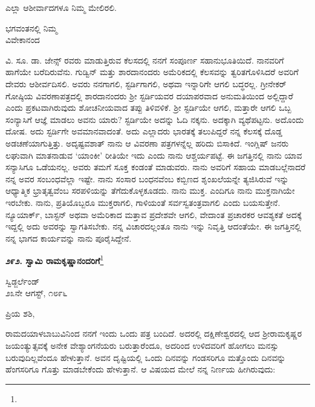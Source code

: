ಎಲ್ಲಾ ಆಶೀರ್ವಾದಗಳೂ ನಿಮ್ಮ ಮೇಲಿರಲಿ.
\vspace{-0.4cm}

\begin{flushright}
ಭಗವಂತನಲ್ಲಿ ನಿಮ್ಮ\\ವಿವೇಕಾನಂದ
\end{flushright}
\vspace{-0.2cm}

ವಿ. ಸೂ.\enginline{-} ಡಾ. ಜೇನ್ಸ್ ರವರು ಮಾಡುತ್ತಿರುವ ಕೆಲಸದಲ್ಲಿ ನನಗೆ ಸಂಪೂರ್ಣ ಸಹಾನುಭೂತಿಯಿದೆ. ನಾನವರಿಗೆ ಹಾಗೆಯೇ ಬರೆದಿರುವೆನು. ಗುಡ್ವಿನ್ ಮತ್ತು ಶಾರದಾನಂದರು ಅಮೆರಿಕದಲ್ಲಿ ಕೆಲಸವನ್ನು ತ್ವರಿತಗೊಳಿಸಿದರೆ ಅವರಿಗೆ ದೇವರು ಆಶೀರ್ವದಿಸಲಿ. ಅವರು ನನಗಾಗಲಿ, ಸ್ಟರ್ಡಿಗಾಗಲಿ, ಅಥವಾ ಇನ್ನಾರಿಗೇ ಆಗಲಿ ಬದ್ಧರಲ್ಲ. ಗ್ರೀನೇಕರ್‌ ಗೋಷ್ಠಿಯ ವಿವರಣಾಪತ್ರದಲ್ಲಿ ಶಾರದಾನಂದರು ಶ‍್ರೀ ಸ್ಟರ್ಡಿಯವರ ದಯಾಪರವಾದ ಅನುಮತಿಯಿಂದ ಅಲ್ಲಿದ್ದಾರೆ ಎಂದು ಪ್ರಕಟವಾಗಿರುವುದು ಶೋಚನೀಯವಾದ ತಪ್ಪು ತಿಳಿವಳಿಕೆ. ಶ‍್ರೀ ಸ್ಟರ್ಡಿಯೇ ಆಗಲಿ, ಮತ್ತಾರೇ ಆಗಲಿ ಒಬ್ಬ ಸಂನ್ಯಾಸಿಗೆ ಆಜ್ಞೆ ಮಾಡಲು ಅವನು ಯಾರು? ಸ್ಟರ್ಡಿಯೇ ಅದನ್ನು ಓದಿ ನಕ್ಕನು. ಅದಕ್ಕಾಗಿ ವ್ಯಥೆಪಟ್ಟನು. ಅದೊಂದು ದೋಷ. ಅದು ಸ್ಟರ್ಡಿಗೇ ಅವಮಾನವಾದಂತೆ. ಅದು ಎಲ್ಲಾದರು ಭಾರತಕ್ಕೆ ತಲುಪಿದ್ದರೆ ನನ್ನ ಕೆಲಸಕ್ಕೆ ದೊಡ್ಡ ಅಡಚಣೆಯಾಗುತ್ತಿತ್ತು. ಅದೃಷ್ಟವಶಾತ್ ನಾನು ಆ ವಿವರಣಾ ಪತ್ರಗಳನ್ನೆಲ್ಲ ಹರಿದು ಬಿಸಾಕಿದೆ. ಇಂಗ್ಲಿಷ್ ಜನರು ಲಘುವಾಗಿ ಮಾತನಾಡುವ ‘ಯಾಂಕೀ’ ರೀತಿಯೇ ಇದು\enginline{-} ಎಂದು ನಾನು ಆಶ್ಚರ್ಯಪಟ್ಟೆ. ಈ ಜಗತ್ತಿನಲ್ಲಿ ನಾನು ಯಾವ ಸನ್ಯಾಸಿಗೂ ಒಡೆಯನಲ್ಲ. ಅವರು ತಮಗೆ ಸೂಕ್ತ ಕಂಡಂತೆ ಮಾಡುವರು. ನಾನು ಅವರಿಗೆ ಸಹಾಯ ಮಾಡಬಲ್ಲೆನಾದರೆ\enginline{-} ನನ್ನ ಅವರ ಸಂಬಂಧವೆಲ್ಲಾ ಇಷ್ಟೇ. ನಾನು ಸಂಸಾರ ಬಂಧನವೆಂಬ ಕಬ್ಬಿಣದ ಶೃಂಖಲೆಯನ್ನೇ ತ್ಯಜಿಸಿರುವೆ\enginline{-} ಇನ್ನು ಆಧ್ಯಾತ್ಮಿಕ ಭ್ರಾತೃತ್ವವೆಂಬ ಸರಪಳಿಯನ್ನು ತೆಗೆದುಕೊಳ್ಳಕೂಡದು. ನಾನು ಮುಕ್ತ. ಎಂದಿಗೂ ನಾನು ಮುಕ್ತನಾಗಿಯೇ ಇರಬೇಕು. ನಾನು, ಪ್ರತಿಯೊಬ್ಬರೂ ಮುಕ್ತರಾಗಲಿ, ಗಾಳಿಯಂತೆ ಸರ್ವಸ್ವತಂತ್ರವಾಗಲಿ ಎಂದು ಬಯಸುತ್ತೇನೆ. ನ್ಯೂಯಾರ್ಕ್, ಬಾಸ್ಟನ್ ಅಥವಾ ಅಮೆರಿಕಾದ ಮತ್ತಾವ ಪ್ರದೇಶವೇ ಆಗಲಿ, ವೇದಾಂತ ಪ್ರಚಾರಕರ ಆವಶ್ಯಕತೆ ಅದಕ್ಕೆ ಇದ್ದಲ್ಲಿ ಅದು ಅವರನ್ನು ಸ್ವಾಗತಿಸಬೇಕು. ನನ್ನ ವಿಚಾರದಲ್ಲಂತೂ ನಾನು ಇನ್ನು ನಿವೃತ್ತಿ ಆದಂತೆಯೇ. ಈ ಜಗತ್ತಿನಲ್ಲಿ ನನ್ನ ಭಾಗದ ಕಾರ್ಯವನ್ನು ನಾನು ಪೂರೈಸಿದ್ದೇನೆ.

\begin{center}
\textbf{೨೯೨. ಸ್ವಾಮಿ ರಾಮಕೃಷ್ಣಾನಂದರಿಗೆ}\footnote{}
\end{center}

\vspace{-0.5cm}

\begin{flushright}
ಸ್ವಿಡ್ಜರ್ಲೆಂಡ್\\೨೩ನೇ ಆಗಸ್ಟ್, ೧೮೯೬
\end{flushright}

\vspace{-0.3cm}

\noindent
ಪ್ರಿಯ ಶಶಿ,

ರಾಮದಯಾಳಬಾಬುವಿನಿಂದ ನನಗೆ ಇಂದು ಒಂದು ಪತ್ರ ಬಂದಿದೆ. ಅದರಲ್ಲಿ ದಕ್ಷಿಣೇಶ್ವರದಲ್ಲಿ ಆದ ಶ‍್ರೀರಾಮಕೃಷ್ಣರ ಜಯಂತ್ಯುತ್ಸವಕ್ಕೆ ಅನೇಕ ವೇಶ್ಯಾಂಗನೆಯರು ಬರುತ್ತಾರೆಂದೂ, ಅದರಿಂದ ಉಳಿದವರಿಗೆ ಹೋಗಲು ಮನಸ್ಸು ಬರುವುದಿಲ್ಲವೆಂದೂ ಹೇಳುತ್ತಾನೆ. ಅವನ ದೃಷ್ಟಿಯಲ್ಲಿ ಒಂದು ದಿನವನ್ನು ಗಂಡಸರಿಗೂ ಮತ್ತೊಂದು ದಿನವನ್ನು ಹೆಂಗಸರಿಗೂ ಗೊತ್ತು ಮಾಡಬೇಕೆಂದು ಹೇಳುತ್ತಾನೆ. ಆ ವಿಷಯದ ಮೇಲೆ ನನ್ನ ನಿರ್ಣಯ ಹೀಗಿರುವುದು:


